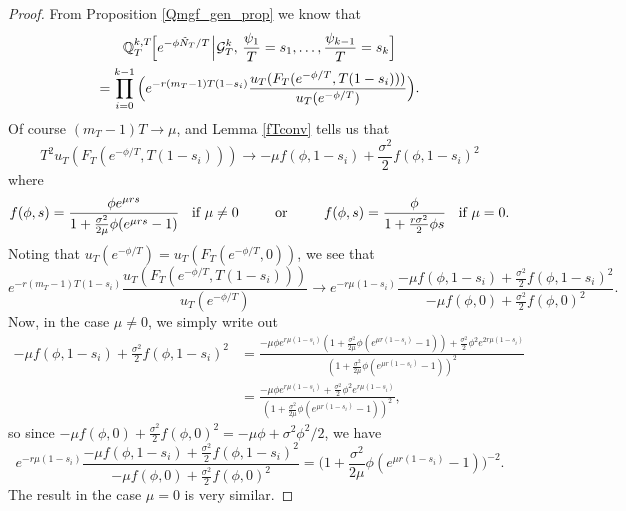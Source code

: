 \documentclass{article}
\theoremstyle{plain}
\theoremstyle{definition}
\newcommand{\Q}{\mathbb{Q}}
\newcommand{\G}{\mathcal{G}}
\begin{document}
\begin{proof}
From Proposition \ref{Qmgf_gen_prop} we know that
\begin{multline*}
\Q^{k,T}_T\hspace{-0.4mm}\Big[e^{-\phi\tilde N_T/T}\hspace{0.2mm}\Big|\hspace{0.2mm}\G^k_T,\,\frac{\psi_1}{T} = s_1, \ldots, \frac{\psi_{k-1}}{T} = s_k\Big] \\
= \prod_{i=0}^{k-1}\Big(e^{-r(m_T-1)T(1-s_i)}\frac{u_T(F_T(e^{-\phi/T},T(1-s_i)))}{u_T(e^{-\phi/T})}\Big).
\end{multline*}
Of course $(m_T-1)T\to\mu$, and Lemma \ref{fTconv} tells us that
\[T^2 u_T(F_T(e^{-\phi/T},T(1-s_i))) \to -\mu f(\phi,1-s_i) + \frac{\sigma^2}{2}f(\phi,1-s_i)^2\]
where
\[f(\phi,s) = \frac{ \phi e^{ \mu r s }}{ 1 + \frac{\sigma^2}{2\mu}  \phi ( e^{ \mu r s } - 1 )} \hspace{2mm} \hbox{ if }\mu\neq 0 \hspace{8mm} \hbox{ or } \hspace{8mm} f(\phi,s) = \frac{ \phi }{ 1 + \frac{r\sigma^2}{2}  \phi s} \hspace{2mm} \hbox{ if }\mu= 0.\]
Noting that $u_T(e^{-\phi/T}) = u_T(F_T(e^{-\phi/T},0))$, we see that
\[e^{-r(m_T-1)T(1-s_i)}\frac{u_T(F_T(e^{-\phi/T},T(1-s_i)))}{u_T(e^{-\phi/T})} \longrightarrow e^{-r\mu(1-s_i)}\frac{-\mu f(\phi,1-s_i) + \frac{\sigma^2}{2}f(\phi,1-s_i)^2}{-\mu f(\phi,0) + \frac{\sigma^2}{2}f(\phi,0)^2}.\]
Now, in the case $\mu\neq 0$, we simply write out
\begin{align*}
-\mu f(\phi,1-s_i) + \frac{\sigma^2}{2}f(\phi,1-s_i)^2 &= \frac{-\mu\phi e^{r\mu(1-s_i)}(1 + \frac{\sigma^2}{2\mu}  \phi ( e^{ \mu r (1-s_i) } - 1 )) + \frac{\sigma^2}{2}\phi^2 e^{2r\mu(1-s_i)}}{(1 + \frac{\sigma^2}{2\mu}  \phi ( e^{ \mu r (1-s_i) } - 1 ))^2}\\
&= \frac{-\mu\phi e^{r\mu(1-s_i)} + \frac{\sigma^2}{2}\phi^2 e^{r\mu(1-s_i)}}{(1 + \frac{\sigma^2}{2\mu}  \phi ( e^{ \mu r (1-s_i) } - 1 ))^2},
\end{align*}
so since $-\mu f(\phi,0) + \frac{\sigma^2}{2}f(\phi,0)^2 = -\mu \phi + \sigma^2\phi^2/2$, we have
\[e^{-r\mu(1-s_i)}\frac{-\mu f(\phi,1-s_i) + \frac{\sigma^2}{2}f(\phi,1-s_i)^2}{-\mu f(\phi,0) + \frac{\sigma^2}{2}f(\phi,0)^2} = \Big(1 + \frac{\sigma^2}{2\mu}  \phi ( e^{ \mu r (1-s_i) } - 1 )\Big)^{-2}.\]
The result in the case $\mu = 0$ is very similar.
\end{proof}
\end{document}
